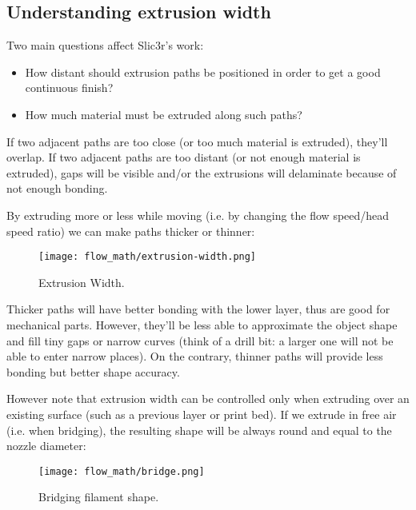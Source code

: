 
\subsection{Understanding extrusion width}
\label{sec:understanding_extrusion_width}

Two main questions affect Slic3r's work:
\begin{itemize}
\item How distant should extrusion paths be positioned in order to get a good continuous finish?
\item How much material must be extruded along such paths?
\end{itemize}

If two adjacent paths are too close (or too much material is extruded), they'll overlap. If two adjacent paths are too distant (or not enough material is extruded), gaps will be visible and/or the extrusions will delaminate because of not enough bonding.

By extruding more or less while moving (i.e. by changing the flow speed/head speed ratio) we can make paths thicker or thinner:

\begin{figure}[H]
\centering
\texttt{[image: flow\_math/extrusion-width.png]}
\caption{Extrusion Width.}
\label{fig:extrusion-width}
\end{figure}

Thicker paths will have better bonding with the lower layer, thus are good for mechanical parts. However, they'll be less able to approximate the object shape and fill tiny gaps or narrow curves (think of a drill bit: a larger one will not be able to enter narrow places). On the contrary, thinner paths will provide less bonding but better shape accuracy.

However note that extrusion width can be controlled only when extruding over an existing surface (such as a previous layer or print bed). If we extrude in free air (i.e. when bridging), the resulting shape will be always round and equal to the nozzle diameter:

\begin{figure}[H]
\centering
\texttt{[image: flow\_math/bridge.png]}
\caption{Bridging filament shape.}
\label{fig:bridge}
\end{figure}


